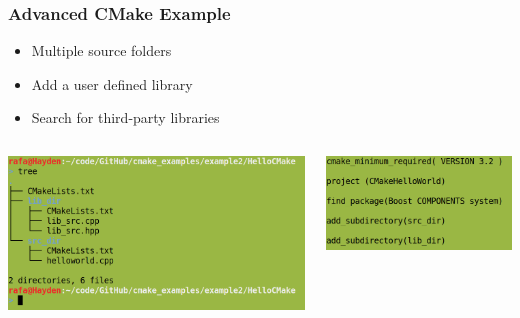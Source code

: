 \begin{frame}[fragile]
  \frametitle{Advanced CMake Example}

    \begin{itemize}
      \item Multiple source folders
      \item Add a user defined library  
      \item Search for third-party libraries
    \end{itemize}

  \begin{columns}
     {
      \begin{center}
        \includegraphics[width=1.0 \textwidth]{img/adv-cmake-dir.png}
      \end{center}
    }
     {
      \begin{center}
        \includegraphics[width=1.0 \textwidth]{img/adv-cmake-code.png}
      \end{center}
    }
\end{columns}

\end{frame}

